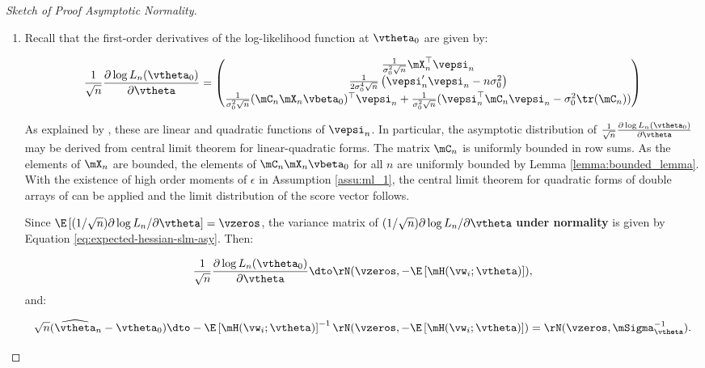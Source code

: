 \documentclass[english,12pt]{book}\usepackage[]{graphicx}\usepackage[]{xcolor}
\begin{document}
\begin{proof}[Sketch of Proof Asymptotic Normality]
\begin{enumerate}
   
   \item Recall that the first-order derivatives of the log-likelihood function at $\vtheta_0$ are given by:
   
  \begin{equation*}
   \frac{1}{\sqrt{n}}\frac{\partial \log L_n(\vtheta_0)}{\partial \vtheta} = \begin{pmatrix}
   \frac{1}{\sigma^2_0\sqrt{n}}\mX_n^\top\vepsi_n\\
   \frac{1}{2\sigma_0^4\sqrt{n}}\left(\vepsi_n'\vepsi_n - n\sigma_0^2\right) \\
   \frac{1}{\sigma_0^2\sqrt{n}}(\mC_n\mX_n\vbeta_0)^\top \vepsi_n + \frac{1}{\sigma_0^2\sqrt{n}}(\vepsi_n^\top\mC_n\vepsi_n - \sigma_0^2\tr(\mC_n))
   \end{pmatrix}
  \end{equation*}


As explained by \citet[][pag. 1905]{lee2004asymptotic}, these are linear and quadratic functions of $\vepsi_n$. In particular, the asymptotic distribution of $\frac{1}{\sqrt{n}}\frac{\partial \log L_n(\vtheta_0)}{\partial \vtheta}$ may be derived from central limit theorem for linear-quadratic forms. The matrix $\mC_n$ is uniformly bounded in row sums. As the elements of $\mX_n$ are bounded, the elements of $\mC_n\mX_n\vbeta_0$ for all $n$ are uniformly bounded by Lemma \ref{lemma:bounded_lemma}. With the existence of high order moments of $\epsilon$ in Assumption \ref{assu:ml_1}, the central limit theorem for quadratic forms of double arrays of \cite{kelejian2001asymptotic} can be applied and the limit distribution of the score vector follows.
   
Since $\E\left[(1 / \sqrt{n}) \partial \log L_n /\partial \vtheta\right]  = \vzeros$,  the variance matrix of $(1 / \sqrt{n}) \partial \log L_n /\partial \vtheta$ \textbf{under normality} is given by Equation \eqref{eq:expected-hessian-slm-asy}. Then:


\begin{equation}
 \frac{1}{\sqrt{n}}\frac{\partial \log L_n(\vtheta_0)}{\partial \vtheta} \dto \rN(\vzeros, -\E\left[\mH(\vw_i;\vtheta)\right]), 
\end{equation}
%
and:

\begin{equation*}
\sqrt{n}(\widehat{\vtheta}_n - \vtheta_0)\dto -\E\left[\mH(\vw_i;\vtheta)\right]^{-1}\rN(\vzeros, -\E\left[\mH(\vw_i;\vtheta)\right]) = \rN(\vzeros, \mSigma_{\vtheta}^{-1}).
\end{equation*}

\end{enumerate}
\end{proof}
\end{document}
